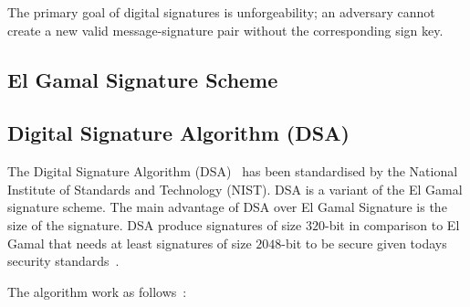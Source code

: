 The primary goal of digital signatures is unforgeability; an adversary cannot create a new valid message-signature pair without the corresponding sign key.

\subsection{El Gamal Signature Scheme}
\label{preliminaries:sign:el_gamal}

\subsection{Digital Signature Algorithm (DSA)}
\label{preliminaries:sign:dsa}

The Digital Signature Algorithm (DSA)~\cite{dsa_nist} has been standardised by the National Institute of Standards and Technology (NIST). DSA is a variant of the El Gamal signature scheme. The main advantage of DSA over El Gamal Signature is the size of the signature. DSA produce signatures of size $320$-bit in comparison to El Gamal that needs at least signatures of size $2048$-bit to be secure given todays security standards~\cite{dsa}.

The algorithm work as follows~\cite{dsa}:

